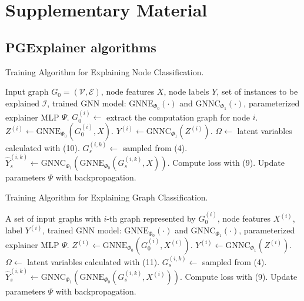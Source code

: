 \chapter{Supplementary Material}

\section{PGExplainer algorithms}

\begin{algorithm}
    \caption{Training Algorithm for Explaining Node Classification.}
    \begin{algorithmic}[1]
    \REQUIRE Input graph $G_0 = (\mathcal{V}, \mathcal{E})$, node features $X$, node labels $Y$, set of instances to be explained $\mathcal{I}$, trained GNN model: $\text{GNNE}_{\Phi_0}(\cdot)$ and $\text{GNNC}_{\Phi_1}(\cdot)$, parameterized explainer MLP $\Psi$.
        \STATE $G^{(i)}_0 \leftarrow$ extract the computation graph for node $i$.
        \STATE $Z^{(i)} \leftarrow \text{GNNE}_{\Phi_0}(G^{(i)}_0, X)$.
        \STATE $Y^{(i)} \leftarrow \text{GNNC}_{\Phi_1}(Z^{(i)})$.
    \ENDFOR
            \STATE $\Omega \leftarrow$ latent variables calculated with (10).
                \STATE $G^{(i,k)}_s \leftarrow$ sampled from (4).
                \STATE $\hat{Y}^{(i,k)}_s \leftarrow \text{GNNC}_{\Phi_1}(\text{GNNE}_{\Phi_0}(G^{(i,k)}_s, X))$.
            \ENDFOR
        \ENDFOR
        \STATE Compute loss with (9).
        \STATE Update parameters $\Psi$ with backpropagation.
    \ENDFOR
    \end{algorithmic}
    \end{algorithm}
    
    \vspace{0.5cm}
    
    \begin{algorithm}
    \caption{Training Algorithm for Explaining Graph Classification.}
    \begin{algorithmic}[1]
    \REQUIRE A set of input graphs with $i$-th graph represented by $G^{(i)}_0$, node features $X^{(i)}$, label $Y^{(i)}$, trained GNN model: $\text{GNNE}_{\Phi_0}(\cdot)$ and $\text{GNNC}_{\Phi_1}(\cdot)$, parameterized explainer MLP $\Psi$.
        \STATE $Z^{(i)} \leftarrow \text{GNNE}_{\Phi_0}(G^{(i)}_0, X^{(i)})$.
        \STATE $Y^{(i)} \leftarrow \text{GNNC}_{\Phi_1}(Z^{(i)})$.
    \ENDFOR
            \STATE $\Omega \leftarrow$ latent variables calculated with (11).
                \STATE $G^{(i,k)}_s \leftarrow$ sampled from (4).
                \STATE $\hat{Y}^{(i,k)}_s \leftarrow \text{GNNC}_{\Phi_1}(\text{GNNE}_{\Phi_0}(G^{(i,k)}_s, X^{(i)}))$.
            \ENDFOR
        \ENDFOR
        \STATE Compute loss with (9).
        \STATE Update parameters $\Psi$ with backpropagation.
    \ENDFOR
    \end{algorithmic}
\end{algorithm}

